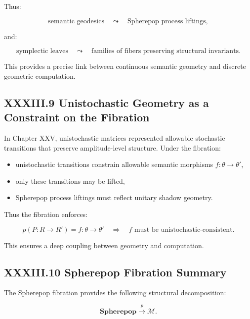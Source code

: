 \documentclass[11pt,letterpaper]{article}
\begin{document}
Thus:

\[
\text{semantic geodesics}
\quad\leadsto\quad
\text{Spherepop process liftings},
\]

and:

\[
\text{symplectic leaves}
\quad\leadsto\quad
\text{families of fibers preserving structural invariants}.
\]

This provides a precise link between continuous semantic geometry and discrete geometric computation.

\subsection{XXXIII.9 Unistochastic Geometry as a Constraint on the Fibration}

In Chapter XXV, unistochastic matrices represented allowable stochastic transitions that preserve amplitude-level structure. Under the fibration:

\begin{itemize}
    \item unistochastic transitions constrain allowable semantic morphisms $f : \theta \to \theta'$,
    \item only these transitions may be lifted,
    \item Spherepop process liftings must reflect unitary shadow geometry.
\end{itemize}

Thus the fibration enforces:

\[
p(P : R \to R') = f : \theta \to \theta'
\quad\Rightarrow\quad
f \text{ must be unistochastic-consistent.}
\]

This ensures a deep coupling between geometry and computation.

\subsection{XXXIII.10 Spherepop Fibration Summary}

The Spherepop fibration provides the following structural decomposition:

\[
\mathbf{Spherepop} \xrightarrow{p} \mathcal{M}.
\]
\end{document}
